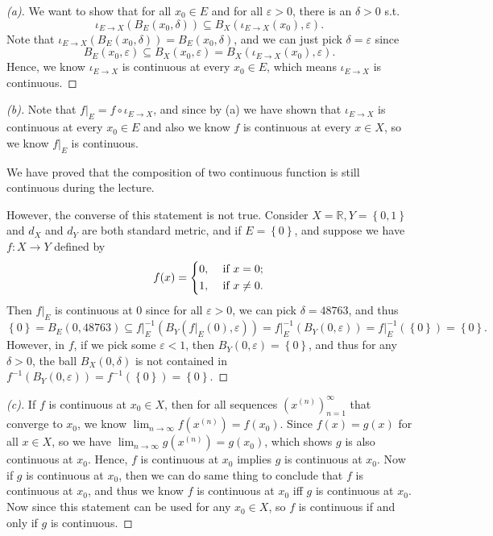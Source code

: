 \begin{proof}[(a)]
   We want to show that for all \(x_0 \in E\) and  for all \(\varepsilon > 0\), there is an \(\delta > 0\) s.t. 
   \[
    \iota_{E \to X} \left( B_E(x_0, \delta ) \right) \subseteq B_X (\iota_{E \to X}(x_0), \varepsilon ). 
   \] Note that \(\iota_{E \to X} \left( B_E(x_0, \delta ) \right) = B_E(x_0, \delta )\), and we can just pick \(\delta = \varepsilon \) since 
   \[
    B_E(x_0, \varepsilon ) \subseteq B_X(x_0, \varepsilon ) = B_X(\iota_{E \to X} (x_0), \varepsilon ).
   \] Hence, we know \(\iota_{E \to X}\) is continuous at every \(x_0 \in E\), which means \(\iota_{E \to X}\) is continuous.       
\end{proof}
\begin{proof}[(b)]
  Note that \(f \vert _E = f \circ \iota_{E \to X}\), and since by (a) we have shown that \(\iota_{E \to X}\) is continuous at every \(x_0 \in E\)  and also we know \(f\) is continuous at every \(x \in X\), so we know \(f \vert_E\) is continuous.
  \begin{note}
    We have proved that the composition of two continuous function is still continuous during the lecture.
  \end{note}    
  However, the converse of this statement is not true. Consider \(X = \mathbb{R}, Y = \left\{ 0, 1 \right\}  \) and \(d_X\) and \(d_Y\) are both standard metric, and if \(E = \left\{ 0 \right\} \), and suppose we have \(f: X \to Y\) defined by 
  \[
    f(x) = \begin{dcases}
      0, &\text{ if } x=0 ;\\
      1, &\text{ if } x \neq 0.
    \end{dcases}
  \]
  Then \(f\vert_E\) is continuous at \(0\) since for all \(\varepsilon > 0\), we can pick \(\delta = 48763\), and thus 
  \[
    \left\{ 0 \right\} = B_E (0, 48763) \subseteq f\vert_E^{-1} \left( B_Y(f\vert_E(0), \varepsilon ) \right) = f\vert_E^{-1}(B_Y(0, \varepsilon )) = f\vert_E^{-1}(\left\{ 0 \right\} ) = \left\{ 0 \right\} . 
  \] However, in \(f\), if we pick some \(\varepsilon < 1\), then \(B_Y(0, \varepsilon ) = \left\{ 0 \right\} \), and thus for any \(\delta > 0\), the ball \(B_X(0, \delta )\) is not contained in \(f^{-1} \left( B_Y(0, \varepsilon ) \right) = f^{-1}(\left\{ 0 \right\} ) = \left\{ 0 \right\} \).     
\end{proof}
\begin{proof}[(c)]
  If \(f\) is continuous at \(x_0 \in X\), then for all sequences \(\left( x^{(n)} \right)_{n=1}^{\infty}  \) that converge to \(x_0\), we know \(\lim_{n \to \infty} f \left( x^{(n)} \right) = f(x_0)  \). Since \(f(x) = g(x)\) for all \(x \in X\), so we have \(\lim_{n \to \infty} g \left( x^{(n)} \right) = g(x_0)  \), which shows \(g\) is also continuous at \(x_0\). Hence, \(f\) is continuous at \(x_0\) implies \(g\) is continuous at \(x_0\). Now if \(g\) is continuous at \(x_0\), then we can do same thing to conclude that \(f\) is continuous at \(x_0\), and thus we know \(f\) is continuous at \(x_0\) iff \(g\) is continuous at \(x_0\). Now since this statement can be used for any \(x_0 \in X\), so \(f\) is continuous if and only if \(g\) is continuous.                      
\end{proof}
